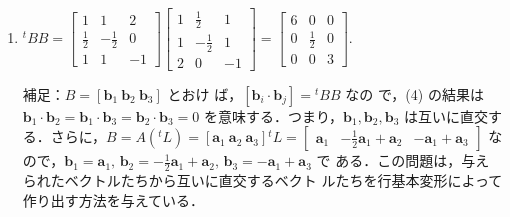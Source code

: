 \documentclass[11pt, uplatex, dvipdfmx]{jsarticle}
\begin{document}
\begin{enumerate}
\begin{enumerate}[(1)]
    \item ${}^{t} B B = \left[
        \begin{array}{rrr}
          1 & 1 & 2\\
          \frac{1}{2} & -\frac{1}{2} & 0\\
          1 & 1 & -1
        \end{array}
      \right] \left[
        \begin{array}{rrr}
          1 & \frac{1}{2} & 1\\
          1 & -\frac{1}{2} & 1\\
          2 & 0 & -1
        \end{array}
      \right] = \left[
        \begin{array}{rrr}
          6 & 0 & 0\\
          0 & \frac{1}{2} & 0\\
          0 & 0 & 3
        \end{array}
      \right]$.

      \vspace{1zh}
      
      補足：$B=\left[ \bm{b}_1 \ \bm{b}_2 \ \bm{b}_3 \right]$ とおけ
      ば，$\left[ \bm{b}_i \cdot \bm{b}_j\right] = {}^{t}BB$ なの
      で，(4) の結果は
      $\bm{b}_1 \cdot \bm{b}_2 = \bm{b}_1 \cdot \bm{b}_3 = \bm{b}_2
      \cdot \bm{b}_3=0$ を意味する．つまり，$\bm{b}_1, \bm{b}_2,
      \bm{b}_3$
      は互いに直交する．さらに，$B=A ({}^{t}L) = \left[
        \bm{a}_1 \ \bm{a}_2 \ \bm{a}_3 \right] {}^{t}L = \left[
        \begin{array}{ccc}
          \bm{a}_1 & -\frac{1}{2}\bm{a}_1 + \bm{a}_2 & -\bm{a}_1 + \bm{a}_3
        \end{array}
      \right]$
      なので，$\bm{b}_1 = \bm{a}_1, \, \bm{b}_2=
      -\frac{1}{2}\bm{a}_1+\bm{a}_2, \, \bm{b}_3=-\bm{a}_1+\bm{a}_3$ で
      ある．この問題は，与えられたベクトルたちから互いに直交するベクト
      ルたちを行基本変形によって作り出す方法を与えている．
      
  \end{enumerate}

  
\end{enumerate}
\end{document}
